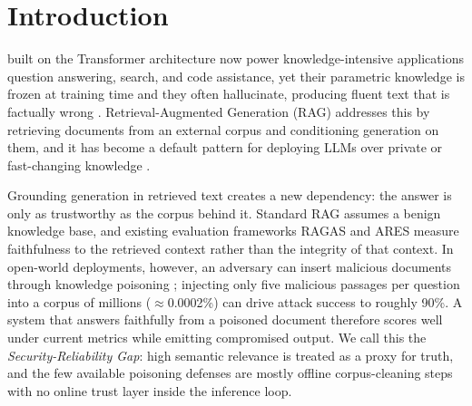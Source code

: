 \section{Introduction}

 built on the Transformer architecture \cite{vaswani2017attention} now power knowledge-intensive applications question answering, search, and code assistance, yet their parametric knowledge is frozen at training time and they often hallucinate, producing fluent text that is factually wrong \cite{ji2023survey}. Retrieval-Augmented Generation (RAG) \cite{lewis2020rag} addresses this by retrieving documents from an external corpus and conditioning generation on them, and it has become a default pattern for deploying LLMs over private or fast-changing knowledge \cite{gao2024retrieval}.

Grounding generation in retrieved text creates a new dependency: the answer is only as trustworthy as the corpus behind it. Standard RAG assumes a benign knowledge base, and existing evaluation frameworks RAGAS \cite{es2024ragas} and ARES \cite{saadfalcon2024ares}\rev{,} measure faithfulness to the retrieved context rather than the integrity of that context. In open-world deployments, however, an adversary can insert malicious documents through knowledge poisoning \cite{zou2024poisoned}; injecting only five malicious passages per question into a corpus of millions ($\approx$0.0002\%) can drive attack success to roughly 90\%. A system that answers faithfully from a poisoned document therefore scores well under current metrics while emitting compromised output. We call this the \emph{Security-Reliability Gap}: high semantic relevance is treated as a proxy for truth, and the few available poisoning defenses are mostly offline corpus-cleaning steps with no online trust layer inside the inference loop.

